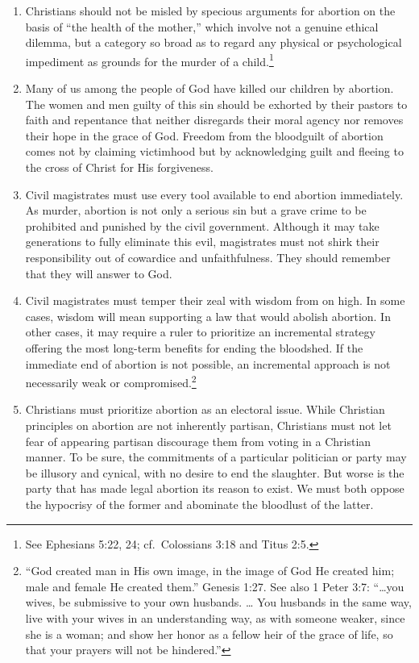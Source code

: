 \documentclass[
]{book}
\begin{document}
\begin{enumerate}
\item
  Christians should not be misled by specious arguments for abortion on the basis of ``the health of the mother,'' which involve not a genuine ethical dilemma, but a category so broad as to regard any physical or psychological impediment as grounds for the murder of a child.\footnote{See Ephesians 5:22, 24; cf.~Colossians 3:18 and Titus 2:5.}
\item
  Many of us among the people of God have killed our children by abortion. The women and men guilty of this sin should be exhorted by their pastors to faith and repentance that neither disregards their moral agency nor removes their hope in the grace of God. Freedom from the bloodguilt of abortion comes not by claiming victimhood but by acknowledging guilt and fleeing to the cross of Christ for His forgiveness.
\item
  Civil magistrates must use every tool available to end abortion immediately. As murder, abortion is not only a serious sin but a grave crime to be prohibited and punished by the civil government. Although it may take generations to fully eliminate this evil, magistrates must not shirk their responsibility out of cowardice and unfaithfulness. They should remember that they will answer to God.
\item
  Civil magistrates must temper their zeal with wisdom from on high. In some cases, wisdom will mean supporting a law that would abolish abortion. In other cases, it may require a ruler to prioritize an incremental strategy offering the most long-term benefits for ending the bloodshed. If the immediate end of abortion is not possible, an incremental approach is not necessarily weak or compromised.\footnote{``God created man in His own image, in the image of God He created him; male and female He created them.'' Genesis 1:27. See also 1 Peter 3:7: ``\ldots you wives, be submissive to your own husbands. \ldots{} You husbands in the same way, live with your wives in an understanding way, as with someone weaker, since she is a woman; and show her honor as a fellow heir of the grace of life, so that your prayers will not be hindered.''}
\item
  Christians must prioritize abortion as an electoral issue. While Christian principles on abortion are not inherently partisan, Christians must not let fear of appearing partisan discourage them from voting in a Christian manner. To be sure, the commitments of a particular politician or party may be illusory and cynical, with no desire to end the slaughter. But worse is the party that has made legal abortion its reason to exist. We must both oppose the hypocrisy of the former and abominate the bloodlust of the latter.

\end{enumerate}
\end{document}
